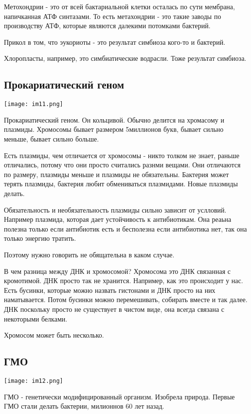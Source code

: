 Метохондрии - это от всей бактариальной клетки осталась по сути
мембрана, напичканная АТФ синтазами. То есть метахондрии -
это такие заводы по производству АТФ, которые являются далекими
потомками бактерий.

Прикол в том, что эукориоты - это результат
симбиоза кого-то и бактерий.

Хлоропласты, например, это симбиатические водрасли. Тоже
результат симбиоза.   

\subsection{Прокариатический геном}
\texttt{[image: im11.png]}

Прокариатический геном. Он кольцивой. Обычно 
делится на хромасому и плазмиды. Хромосомы бывает размером 
5миллионов букв, бывает сильно меньше, 
бывает сильно больше. 

Есть плазмиды, чем отличается от хромосомы - никто толком не знает, 
раньше отличались, потому что они просто считались разнми вещами.
Они отличаются по размеру, плазмиды меньше и плазмиды не 
обязательны. Бактерия может терять плазмиды, бактерия любит 
обмениваться плазмидами. Новые плазмиды делать. 

Обязательность и необязательность плазмиды сильно зависит от услловий.
Например плазмида, которая дает
устойчивость к антибиотикам. Она реаьна полезна только
если антибиотик есть и бесполезна если антибиотика нет,
так она только энергию тратить.

Поэтому нужно говорить не обящательна в каком случае.

В чем разница между ДНК и хромосомой?
Хромосома это ДНК связанная с кромотимой. ДНК
просто так не хранится. Например,
как это происходит у нас. Есть бусинки,
которые можно назвать гистонами и ДНК просто на них
наматывается. Потом бусинки можно перемешивать,
собирать вместе и так далее. ДНК поскольку
просто не существует в чистом виде, она
всегда связана с некоторыми белками.

Хромосом может быть несколько.   

\subsection{ГМО}
\texttt{[image: im12.png]}

ГМО - генетически модифицированный организм. Изобрела природа. 
Первые ГМО стали делать бактерии, милионнов 60 лет назад. 

